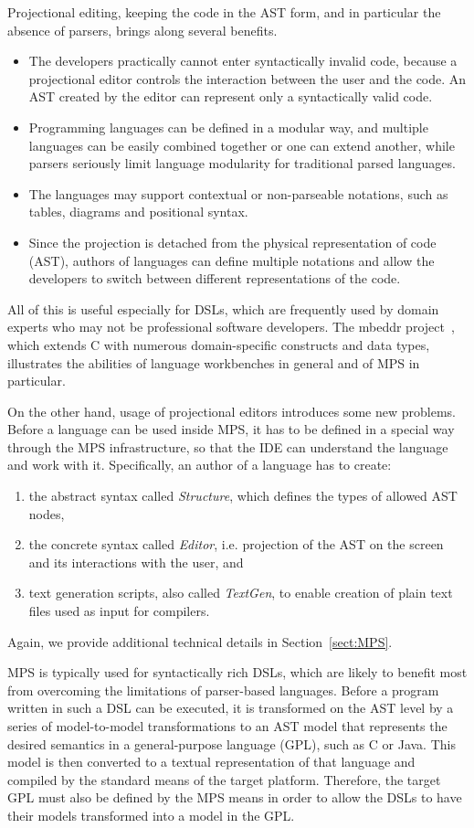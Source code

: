 Projectional editing, keeping the code in the AST form, and in particular the absence of parsers, brings along several benefits.
\begin{itemize}
	\item The developers practically cannot enter syntactically invalid code, because a projectional editor controls the interaction between the user and the code. An AST created by the editor can represent only a syntactically valid code.
	\item Programming languages can be defined in a modular way, and multiple languages can be easily combined together or one can extend another, while parsers seriously limit language modularity for traditional parsed languages.
	\item The languages may support contextual or non-parseable notations, such as tables, diagrams and positional syntax.
	\item Since the projection is detached from the physical representation of code (AST), authors of languages can define multiple notations and allow the developers to switch between different representations of the code.
\end{itemize}
All of this is useful especially for DSLs, which are frequently used by domain experts who may not be professional software developers.
The mbeddr project~\cite{ref:MBEDDR}, which extends C with numerous domain-specific constructs and data types, illustrates the abilities of language workbenches in general and of MPS in particular.

On the other hand, usage of projectional editors introduces some new problems.
Before a language can be used inside MPS, it has to be defined in a special way through the MPS infrastructure, so that the IDE can understand the language and work with it.
Specifically, an author of a language has to create:
\begin{enumerate}
	\item the abstract syntax called \emph{Structure}, which defines the types of allowed AST nodes,
	\item the concrete syntax called \emph{Editor}, i.e. projection of the AST on the screen and its interactions with the user, and
	\item text generation scripts, also called \emph{TextGen}, to enable creation of plain text files used as input for compilers.
\end{enumerate}	
Again, we provide additional technical details in Section~\ref{sect:MPS}.

MPS is typically used for syntactically rich DSLs, which are likely to benefit most from overcoming the limitations of parser-based languages.
Before a program written in such a DSL can be executed, it is transformed on the AST level by a series of model-to-model transformations to an AST model that represents the desired semantics in a general-purpose language (GPL), such as C or Java.
This model is then converted to a textual representation of that language and compiled by the standard means of the target platform.
Therefore, the target GPL must also be defined by the MPS means in order to allow the DSLs to have their models transformed into a model in the GPL.

